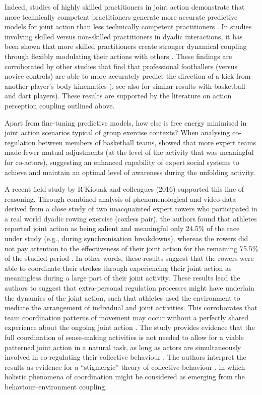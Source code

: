 \begin{CJK}{UTF8}{gbsn}
Indeed, studies of highly skilled practitioners in joint action demonstrate that more technically competent practitioners generate more accurate predictive models for joint action than less technically competent practitioners \citep{Tomeo2012,Aglioti2008,Mulligan2016}.   In studies involving skilled versus non-skilled practitioners in dyadic interactions, it has been shown that more skilled practitioners create stronger dynamical coupling through flexibly modulating their actions with others \citep{Schmidt2011,Caron2017}. These findings are corroborated by other studies that find that professional footballers (versus novice controls) are able to more accurately predict the direction of a kick from another player's body kinematics (\cite{Tomeo2012}, see also \cite{Aglioti2008,Mulligan2016} for similar results with basketball and dart players).  These results are supported by the literature on action perception coupling outlined above.

Apart from fine-tuning predictive models, how else is free energy minimised in joint action scenarios typical of group exercise contexts?  When analysing co-regulation between members of basketball teams, \textcite{Bourbousson2015} showed that more expert teams made fewer mutual adjustments (at the level of the activity that was meaningful for co-actors), suggesting an enhanced capability of expert social systems to achieve and maintain an optimal level of awareness during the unfolding activity.

A recent field study by R'Kiouak and colleagues (2016) supported this line of reasoning.  Through combined analysis of phenomenological and video data derived from a close study of two unacquainted expert rowers who participated in a real world dyadic rowing exercise (coxless pair), the authors found that athletes reported joint action as being salient and meaningful only 24.5\% of the race under study (e.g., during synchronisation breakdowns), whereas the rowers did not pay attention to the effectiveness of their joint action for the remaining 75.5\% of the studied period \citep{RKiouak2016}.  In other words, these results suggest that the rowers were able to coordinate their strokes through experiencing their joint action as meaningless during a large part of their joint activity.  These results lead the authors to suggest that extra-personal regulation processes might have underlain the dynamics of the joint action, such that athletes used the environment to mediate the arrangement of individual and joint activities. This corroborates that team coordination patterns of movement may occur without a perfectly shared experience about the ongoing joint action \citep{Bourbousson2011,Bourbousson2012}. The study provides evidence that the full coordination of sense-making activities is not needed to allow for a viable patterned joint action in a natural task, as long as actors are simultaneously involved in co-regulating their collective behaviour \citep{Froese2011,Froese2014}.
The authors interpret the results as evidence for a ``stigmergic'' theory of collective behaviour  \citep{Susi2001,Avvenuti2013}, in which holistic phenomena of coordination might be considered as emerging from the behaviour–environment coupling.


\end{CJK}
